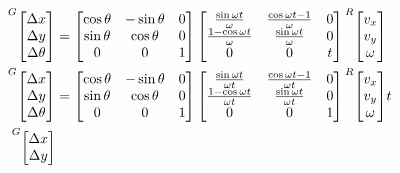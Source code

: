 \begin{align*}
  \crdfrm{G}{\begin{bmatrix}
    \Delta x \\
    \Delta y \\
    \Delta \theta
  \end{bmatrix}} &=
  \begin{bmatrix}
    \cos\theta & -\sin\theta & 0 \\
    \sin\theta &  \cos\theta & 0 \\
             0 &           0 & 1
  \end{bmatrix}
  \begin{bmatrix}
    \frac{\sin\omega t}{\omega} & \frac{\cos\omega t - 1}{\omega} & 0 \\
    \frac{1 - \cos\omega t}{\omega} & \frac{\sin\omega t}{\omega} & 0 \\
    0 & 0 & t
  \end{bmatrix}
  \crdfrm{R}{\begin{bmatrix}
    v_x \\
    v_y \\
    \omega
  \end{bmatrix}} \\
  \crdfrm{G}{\begin{bmatrix}
    \Delta x \\
    \Delta y \\
    \Delta \theta
  \end{bmatrix}} &=
  \begin{bmatrix}
    \cos\theta & -\sin\theta & 0 \\
    \sin\theta &  \cos\theta & 0 \\
             0 &           0 & 1
  \end{bmatrix}
  \begin{bmatrix}
    \frac{\sin\omega t}{\omega t} & \frac{\cos\omega t - 1}{\omega t} & 0 \\
    \frac{1 - \cos\omega t}{\omega t} & \frac{\sin\omega t}{\omega t} & 0 \\
    0 & 0 & 1
  \end{bmatrix}
  \crdfrm{R}{\begin{bmatrix}
    v_x \\
    v_y \\
    \omega
  \end{bmatrix}} t \\
  \crdfrm{G}{\begin{bmatrix}
    \Delta x \\
    \Delta y \\

\end{bmatrix}}
\end{align*}
